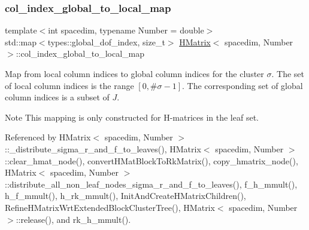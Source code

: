 \mbox{\label{classHMatrix_ab337c7b4f2f40699b9b7f3ab17a1e056}} 
\subsubsection{\texorpdfstring{col\+\_\+index\+\_\+global\+\_\+to\+\_\+local\+\_\+map}{col\_index\_global\_to\_local\_map}}
{\footnotesize\ttfamily template$<$int spacedim, typename Number = double$>$ \\
std\+::map$<$types\+::global\+\_\+dof\+\_\+index, size\+\_\+t$>$ \hyperlink{classHMatrix}{H\+Matrix}$<$ spacedim, Number $>$\+::col\+\_\+index\+\_\+global\+\_\+to\+\_\+local\+\_\+map\hspace{0.3cm}{\ttfamily [private]}}

Map from local column indices to global column indices for the cluster $\sigma$. The set of local column indices is the range $[0, \#\sigma - 1]$. The corresponding set of global column indices is a subset of $J$.


\begin{DoxyDescription}
\item[Note ]This mapping is only constructed for H-\/matrices in the leaf set. 
\end{DoxyDescription}

Referenced by H\+Matrix$<$ spacedim, Number $>$\+::\+\_\+distribute\+\_\+sigma\+\_\+r\+\_\+and\+\_\+f\+\_\+to\+\_\+leaves(), H\+Matrix$<$ spacedim, Number $>$\+::clear\+\_\+hmat\+\_\+node(), convert\+H\+Mat\+Block\+To\+Rk\+Matrix(), copy\+\_\+hmatrix\+\_\+node(), H\+Matrix$<$ spacedim, Number $>$\+::distribute\+\_\+all\+\_\+non\+\_\+leaf\+\_\+nodes\+\_\+sigma\+\_\+r\+\_\+and\+\_\+f\+\_\+to\+\_\+leaves(), f\+\_\+h\+\_\+mmult(), h\+\_\+f\+\_\+mmult(), h\+\_\+rk\+\_\+mmult(), Init\+And\+Create\+H\+Matrix\+Children(), Refine\+H\+Matrix\+Wrt\+Extended\+Block\+Cluster\+Tree(), H\+Matrix$<$ spacedim, Number $>$\+::release(), and rk\+\_\+h\+\_\+mmult().

\mbox{\label{classHMatrix_ac30ae65e37ec5e4ccc7de2f6b9ea91e6}} 
